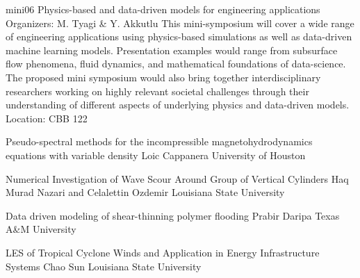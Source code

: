\mini
{mini06}
{Physics-based and data-driven models for engineering applications}
{Organizers: M. Tyagi \& Y. Akkutlu}
{This mini-symposium will cover a wide range of engineering applications using physics-based simulations as well as data-driven machine learning models. Presentation examples would range from subsurface flow phenomena, fluid dynamics, and mathematical foundations of data-science. The proposed mini symposium would also bring together interdisciplinary researchers working on highly relevant societal challenges through their understanding of different aspects of underlying physics and data-driven models.}
{Location: CBB 122}

\begin{talks}
\item\talk
{Pseudo-spectral methods for the incompressible magnetohydrodynamics equations with variable density}
{Loic Cappanera}
{University of Houston}
\item\talk
{Numerical Investigation of Wave Scour Around Group of Vertical Cylinders }
{Haq Murad Nazari and  Celalettin Ozdemir}
{Louisiana State University}
\item\talk
{Data driven modeling of shear-thinning polymer flooding}
{Prabir Daripa}
{Texas A\&M University}
\item\talk
{LES of Tropical Cyclone Winds and Application in Energy Infrastructure Systems}
{Chao Sun}
{Louisiana State University}
\end{talks}
\room
